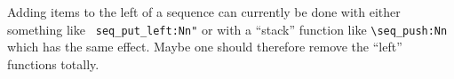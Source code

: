 \documentclass{article}
\begin{document}
 Adding items to the left of a sequence can currently be done with
 either something like \verb+ seq_put_left:Nn"+ or with a ``stack'' function
 like \verb+\seq_push:Nn+ which has the same effect. Maybe one should
 therefore remove the ``left'' functions totally.
%
%
%
%
%
%              
\end{document}
